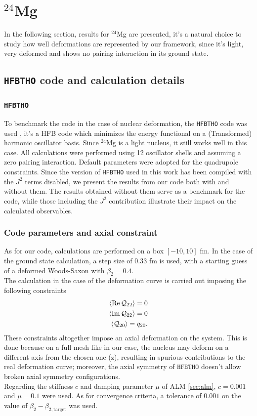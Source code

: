 \section{$^{24}$Mg}
In the following section, results for $^{24}$Mg are presented, it's a natural choice to study how well deformations are represented by our framework, since it's light, very deformed and shows no pairing interaction in its ground state.
\subsection{\texttt{HFBTHO} code and calculation details}
\subsubsection{\texttt{HFBTHO}}
To benchmark the code in the case of nuclear deformation, the \texttt{HFBTHO} code was used \cite{MAREVIC2022108367}, it's a HFB code which minimizes the energy functional on a (Transformed) harmonic oscillator basis. Since $^{24}$Mg is a light nucleus, it still works well in this case.
All calculations were performed using 12 oscillator shells and assuming a zero pairing interaction. 
Default parameters were adopted for the quadrupole constraints. 
Since the version of \texttt{HFBTHO} used in this work has been compiled with the $J^2$ terms disabled, we present the results from our code both with and without them. 
The results obtained without them serve as a benchmark for the code, 
while those including the $J^2$ contribution illustrate their impact on the calculated observables.
\subsubsection{Code parameters and axial constraint}
As for our code, calculations are performed on a box $[-10, 10]$ fm.
In the case of the ground state calculation, a step size of $0.33$ fm is used, with a starting guess of a deformed Woods-Saxon with $\beta_2=0.4$.
\\The calculation in the case of the deformation curve is carried out imposing the following constraints
\begin{align}
  \expval{\Re\mathcal Q_{22}} = 0
  \\\expval{\Im \mathcal Q_{22}} = 0
  \\\expval{\mathcal Q_{20}} = q_{20}.
\end{align}
These constraints altogether impose an axial deformation on the system. This is done because on a full mesh like in our case, the nucleus may deform on a different axis from the chosen one (z), resulting in spurious contributions to the real deformation curve; moreover, the axial symmetry of $\texttt{HFBTHO}$ doesn't allow broken axial symmetry configurations.
\\Regarding the stiffness $c$ and damping parameter $\mu$ of ALM \ref{sec:alm}, $c=0.001$ and $\mu=0.1$ were used. As for convergence criteria, a tolerance of $0.001$ on the value of $\beta_2 - \beta_{2, \text{target}}$ was used.
